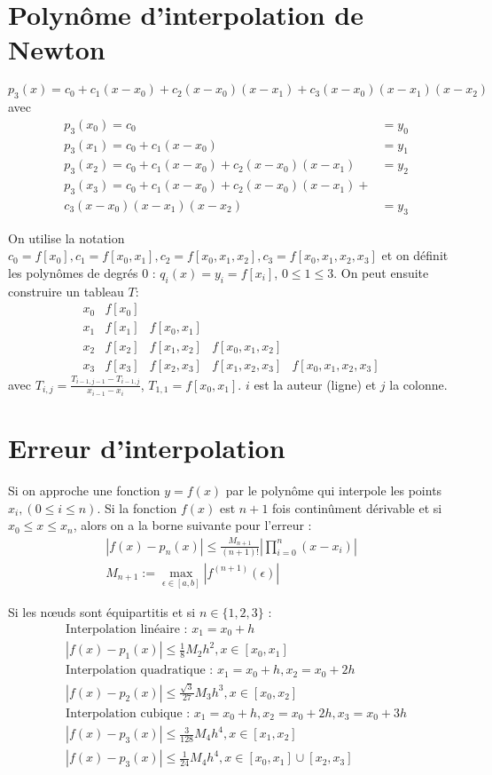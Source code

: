 \documentclass[a4paper,9pt]{extarticle}
\begin{document}
\section{Polynôme d'interpolation de Newton}

$p_3(x)=c_0+c_1(x-x_0)+c_2(x-x_0)(x-x_1)+c_3(x-x_0)(x-x_1)(x-x_2)$ avec
\begin{align*}
&p_3(x_0)=c_0 &=y_0\\
&p_3(x_1)=c_0+c_1(x-x_0) &=y_1\\
&p_3(x_2)=c_0+c_1(x-x_0)+c_2(x-x_0)(x-x_1) &=y_2\\
&p_3(x_3)=c_0+c_1(x-x_0)+c_2(x-x_0)(x-x_1)+\\&c_3(x-x_0)(x-x_1)(x-x_2) &=y_3
\end{align*}

On utilise la notation $c_0=f[x_0],c_1=f[x_0,x_1],c_2=f[x_0,x_1,x_2],c_3=f[x_0,x_1,x_2,x_3]$ et on définit les polynômes de degrés $0$ : $q_i(x)=y_i=f[x_i]$, $0\leq 1\leq 3$. On peut ensuite construire un tableau $T$:
$$
\begin{array}{c|cccc}
x_0 & f[x_0]\\
x_1 & f[x_1] & f[x_0,x_1]\\
x_2 & f[x_2] & f[x_1,x_2] & f[x_0,x_1,x_2]\\
x_3 & f[x_3] & f[x_2,x_3] & f[x_1,x_2,x_3] & f[x_0,x_1,x_2,x_3]
\end{array}
$$
avec $T_{i,j} = \frac{T_{i-1,j-1}-T_{i-1,j}}{x_{i-1}-x_{i}}$, \textbf{$T_{1,1}=f[x_0,x_1]$}. $i$ est la auteur (ligne) et $j$ la colonne.

\section{Erreur d'interpolation}

Si on approche une fonction $y=f(x)$ par le polynôme qui interpole les points $x_i,(0 \leq i \leq n)$. Si la fonction $f(x)$ est $n+1$ fois continûment dérivable et si $x_0 \leq x \leq x_n$, alors on a la borne suivante pour l'erreur : 
\begin{align*}
|f(x)-p_n(x)|\leq\frac{M_{n+1}}{(n+1)!}|\prod^n_{i=0}(x-x_i)|\\
M_{n+1} := \max_{\epsilon\in[a,b]}|f^{(n+1)}(\epsilon)|
\end{align*}

Si les nœuds sont équipartitis et si $n\in\{1,2,3\}$ :
\begin{align*}
&\text{Interpolation linéaire : }x_1=x_0+h \\
&|f(x)-p_1(x)|\leq \frac{1}{8}M_2h^2,x\in [x_0,x_1] \\
&\text{Interpolation quadratique : }x_1=x_0+h,x_2=x_0+2h \\
&|f(x)-p_2(x)|\leq \frac{\sqrt{3}}{27}M_3h^3,x\in [x_0,x_2]\\
&\text{Interpolation cubique : }x_1=x_0+h,x_2=x_0+2h,x_3=x_0+3h \\
&|f(x)-p_3(x)|\leq \frac{3}{128}M_4h^4,x\in[x_1,x_2]\\
&|f(x)-p_3(x)|\leq \frac{1}{24}M_4h^4,x\in[x_0,x_1]\cup[x_2,x_3]\\
\end{align*}
\end{document}
